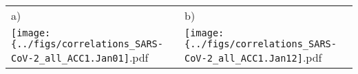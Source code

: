 \documentclass[]{standalone}
\begin{document}
\begin{tabular}{ll}
a) & b) \\[-1.275em]
\hspace{1ex} \texttt{[image: \{../figs/correlations\_SARS-CoV-2\_all\_ACC1.Jan01]}.pdf}
&
\hspace{1ex} \texttt{[image: \{../figs/correlations\_SARS-CoV-2\_all\_ACC1.Jan12]}.pdf}
\end{tabular}
\end{document}
